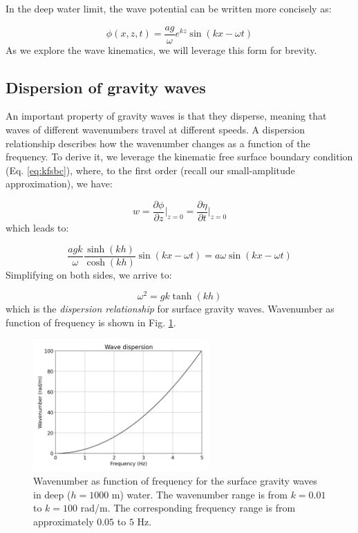 \documentclass[12pt]{article}
\numberwithin{equation}{section}
\numberwithin{figure}{section}
\numberwithin{table}{section}
\begin{document}
In the deep water limit, the wave potential can be written more concisely as:

\begin{equation}
  \phi(x, z, t) = \frac{a g}{\omega} e^{kz} \sin(kx - \omega t)
  \label{eq:deep_water_wave_potential}
\end{equation}
As we explore the wave kinematics, we will leverage this form for brevity.

\subsection{Dispersion of gravity waves}

An important property of gravity waves is that they disperse, meaning that
waves of different wavenumbers travel at different speeds.
A dispersion relationship describes how the wavenumber changes as a function
of the frequency.
To derive it, we leverage the kinematic free surface boundary condition
(Eq. \ref{eq:kfsbc}), where, to the first order (recall our small-amplitude
approximation), we have:

\begin{equation}
  w = \frac{\partial \phi}{\partial z}\Big|_{z=0} = \frac{\partial \eta}{\partial t}\Big|_{z=0}
\end{equation}
which leads to:

\begin{equation}
  \frac{a g k}{\omega} \frac{\sinh(kh)}{\cosh(kh)} \sin(kx - \omega t) =
  a \omega \sin(kx - \omega t)
\end{equation}
Simplifying on both sides, we arrive to:

\begin{equation}
  \omega^2 = g k \tanh(kh)
\end{equation}
which is the \textit{dispersion relationship} for surface gravity waves.
Wavenumber as function of frequency is shown in Fig. \ref{fig:wave_dispersion}.

\begin{figure}[h]
  \centering
  \includegraphics[width=0.6\textwidth]{assets/fig_wave_dispersion.png}
  \caption{
    Wavenumber as function of frequency for the surface gravity waves in deep
    ($h = 1000$ m) water.
    The wavenumber range is from $k = 0.01$ to $k = 100$ rad/m.
    The corresponding frequency range is from approximately $0.05$ to $5$ Hz.
  }
  \label{fig:wave_dispersion}
\end{figure}
\end{document}
